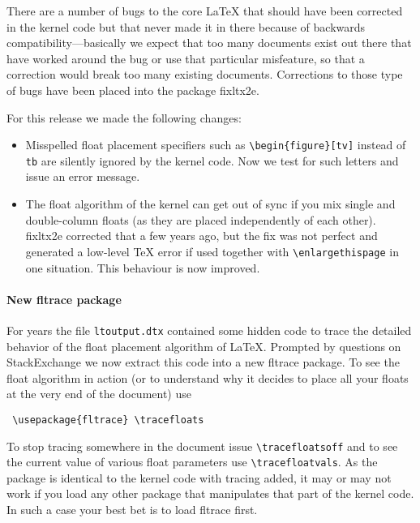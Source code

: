 \documentclass{ltnews}
\begin{document}
There are a number of bugs to the core \LaTeX{} that should have been
corrected in the kernel code but that never made it in there because
of backwards compatibility---basically we expect that too many
documents exist out there that have worked around the bug or use that
particular misfeature, so that a correction would break too many
existing documents. Corrections to those type of bugs have been placed
into the package \textsf{fixltx2e}.
 

For this release we made the following changes:
\begin{itemize}
\item
   Misspelled float placement specifiers such as
   \verb=\begin{figure}[tv]= instead of \texttt{tb} are silently
   ignored by the kernel code.  Now we test for such letters and issue
   an error message.
\item
   The float algorithm of the kernel can get out of sync if you mix
   single and double-column floats (as they are placed independently
   of each other). \textsf{fixltx2e} corrected that a few years ago,
   but the fix was not perfect and generated a low-level \TeX{} error
   if used together with \verb=\enlargethispage= in one situation.
   This behaviour is now improved.
\end{itemize}




\paragraph{New \textsf{fltrace} package}

For years the file \texttt{ltoutput.dtx} contained some hidden code to
trace the detailed behavior of the float placement algorithm of
\LaTeX. Prompted by questions on StackExchange we now extract this
code into a new \textsf{fltrace} package. To see the float algorithm
in action (or to understand why it decides to place all your floats at
the very end of the document) use
\begin{verbatim}
 \usepackage{fltrace} \tracefloats
\end{verbatim}
To stop tracing somewhere in the document issue
\verb=\tracefloatsoff= and to see the current value of various float
parameters use \verb=\tracefloatvals=. As the package is identical to
the kernel code with tracing added, it may or may not work if you load any
other package that manipulates that part of the kernel code. In such a
case your best bet is to load \textsf{fltrace} first.
\end{document}
